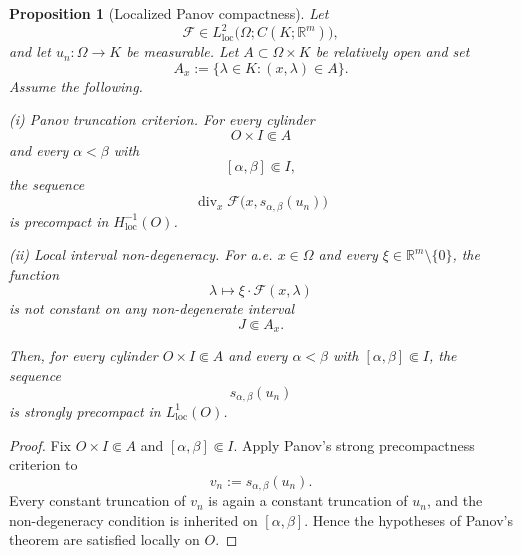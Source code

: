 \documentclass[11pt]{amsart}
\numberwithin{equation}{section}
\theoremstyle{plain}
\newtheorem{proposition}[theorem]{Proposition}
\theoremstyle{definition}
\theoremstyle{remark}
\begin{document}
\begin{proposition}[Localized Panov compactness]
\label{thm:local-qualitative-averaging}
Let
\[
    \mathcal F\in
    L^2_{\mathrm{loc}}
    \bigl(\Omega;C(K;\mathbb R^m)\bigr),
\]
and let \(u_n:\Omega\to K\) be measurable.  Let
\(A\subset\Omega\times K\) be relatively open and set
\[
    A_x:=\{\lambda\in K:(x,\lambda)\in A\}.
\]
Assume the following.

\smallskip
\noindent
\emph{(i) Panov truncation criterion.}
For every cylinder
\[
    O\times I\Subset A
\]
and every \(\alpha<\beta\) with
\[
    [\alpha,\beta]\Subset I,
\]
the sequence
\begin{equation}
\label{eq:panov-truncation-criterion}
    \operatorname{div}_x
    \mathcal F\bigl(x,s_{\alpha,\beta}(u_n)\bigr)
\end{equation}
is precompact in \(H^{-1}_{\mathrm{loc}}(O)\).

\smallskip
\noindent
\emph{(ii) Local interval non-degeneracy.}
For a.e. \(x\in\Omega\) and every
\(\xi\in\mathbb R^m\setminus\{0\}\), the function
\[
    \lambda\longmapsto
    \xi\cdot\mathcal F(x,\lambda)
\]
is not constant on any non-degenerate interval
\[
    J\Subset A_x.
\]

Then, for every cylinder \(O\times I\Subset A\) and every
\(\alpha<\beta\) with \([\alpha,\beta]\Subset I\), the sequence
\[
    s_{\alpha,\beta}(u_n)
\]
is strongly precompact in \(L^1_{\mathrm{loc}}(O)\).
\end{proposition}

\begin{proof}
Fix \(O\times I\Subset A\) and
\([\alpha,\beta]\Subset I\).  Apply Panov's strong precompactness criterion
\cite[Theorem~6]{Panov_arma} to
\[
    v_n:=s_{\alpha,\beta}(u_n).
\]
Every constant truncation of \(v_n\) is again a constant truncation of
\(u_n\), and the non-degeneracy condition is inherited on
\([\alpha,\beta]\).  Hence the hypotheses of Panov's theorem are satisfied
locally on \(O\).
\end{proof}
\end{document}
